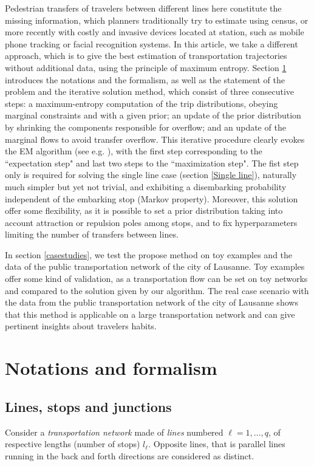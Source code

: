 \documentclass{bmcart}
\begin{document}
Pedestrian transfers of travelers between different lines here constitute the missing information, which planners traditionally try to estimate using census, or more recently with costly and invasive devices located at station, such as mobile phone tracking or facial recognition systems. In this article, we take a different approach, which is to give the best estimation of transportation trajectories without additional data, using the principle of maximum entropy. Section \ref{notforma} introduces the notations and the formalism, as well as the statement of the problem and the iterative solution method, which consist of three consecutive steps: a maximum-entropy computation of the trip distributions, obeying marginal constraints and with a given prior;  an update of the prior distribution by shrinking the components responsible for overflow; and an update of the marginal flows to avoid transfer overflow. This iterative procedure clearly evokes the EM algorithm (see e.g. \cite{dempster1977maximum}  \cite{bavaud2009information}), with the first step corresponding to the ``expectation step" and last two steps to the ``maximization step". The fist step only is required for solving the single line case (section \ref{Single line}), naturally much simpler but  yet  not trivial, and exhibiting a disembarking probability independent of the embarking stop (Markov property).  Moreover, this solution offer some flexibility, as it is possible to set a prior distribution taking into account attraction or repulsion poles among stops, and to fix hyperparameters limiting the number of transfers between lines.

In section \ref{casestudies}, we test the propose method on toy examples and the data of the public transportation network of the city of Lausanne. Toy examples offer some kind of validation, as a transportation flow can be set on toy networks and compared to the solution given by our algorithm. The real case scenario with the data from the public transportation network of the city of Lausanne shows that this method is applicable on a large transportation network and can give pertinent insights about travelers habits.



\section{Notations and formalism}
\label{notforma}
\subsection{Lines, stops  and junctions}
\label{Lines and junctions}
Consider a \emph{transportation network} made of \emph{lines} numbered $\ell=1,\ldots, q$, of respective lengths (number of stops) $l_\ell$.  Opposite lines, that is parallel lines running in the back and forth directions are considered as distinct. 
\end{document}

